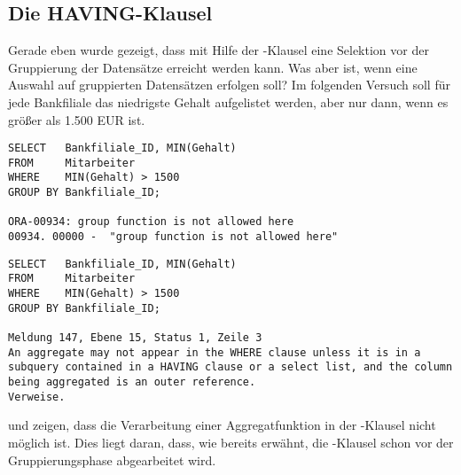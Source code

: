       \subsection{Die HAVING-Klausel}
        Gerade eben wurde gezeigt, dass mit Hilfe der \WHERE-Klausel eine Selektion vor der Gruppierung der Datensätze erreicht werden kann. Was aber ist, wenn eine Auswahl auf gruppierten Datensätzen erfolgen soll? Im folgenden Versuch soll für jede Bankfiliale das niedrigste Gehalt aufgelistet werden, aber nur dann, wenn es größer als 1.500 EUR ist.
        \begin{lstlisting}[language=oracle_sql,caption={Ein Versuch\dots mit Oracle},label=sql05_16]
SELECT   Bankfiliale_ID, MIN(Gehalt)
FROM     Mitarbeiter
WHERE    MIN(Gehalt) > 1500
GROUP BY Bankfiliale_ID;

ORA-00934: group function is not allowed here
00934. 00000 -  "group function is not allowed here"
        \end{lstlisting}
        \begin{lstlisting}[language=ms_sql,caption={Der gleiche Versuch\dots mit MS SQL Server},label=sql05_17]
SELECT   Bankfiliale_ID, MIN(Gehalt)
FROM     Mitarbeiter
WHERE    MIN(Gehalt) > 1500
GROUP BY Bankfiliale_ID;

Meldung 147, Ebene 15, Status 1, Zeile 3
An aggregate may not appear in the WHERE clause unless it is in a subquery contained in a HAVING clause or a select list, and the column being aggregated is an outer reference.
Verweise.
        \end{lstlisting}
         und  zeigen, dass die Verarbeitung einer Aggregatfunktion in der \WHERE-Klausel nicht möglich ist. Dies liegt daran, dass, wie bereits erwähnt, die \WHERE-Klausel schon vor der Gruppierungsphase abgearbeitet wird.

